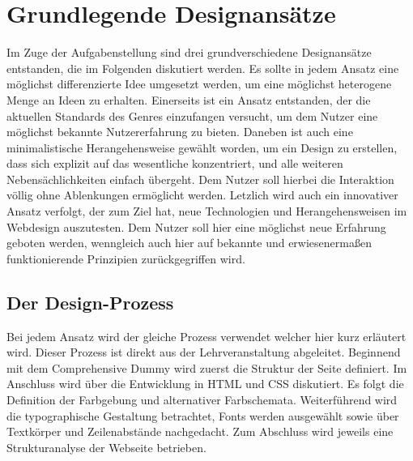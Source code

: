 \section{Grundlegende Designansätze}
Im Zuge der Aufgabenstellung sind drei grundverschiedene Designansätze entstanden, die im Folgenden diskutiert werden. Es sollte in jedem Ansatz eine möglichst differenzierte Idee umgesetzt werden, um eine möglichst heterogene Menge an Ideen zu erhalten.
Einerseits ist ein Ansatz entstanden, der die aktuellen Standards des Genres einzufangen versucht, um dem Nutzer eine möglichst bekannte Nutzererfahrung zu bieten.
Daneben ist auch eine minimalistische Herangehensweise gewählt worden, um ein Design zu erstellen, dass sich explizit auf das wesentliche konzentriert, und alle weiteren Nebensächlichkeiten einfach übergeht. Dem Nutzer soll hierbei die Interaktion völlig ohne Ablenkungen ermöglicht werden.
Letzlich wird auch ein innovativer Ansatz verfolgt, der zum Ziel hat, neue Technologien und Herangehensweisen im Webdesign auszutesten. Dem Nutzer soll hier eine möglichst neue Erfahrung geboten werden, wenngleich auch hier auf bekannte und erwiesenermaßen funktionierende Prinzipien zurückgegriffen wird.
\subsection{Der Design-Prozess}
Bei jedem Ansatz wird der gleiche Prozess verwendet welcher hier kurz erläutert wird. Dieser Prozess ist direkt aus der Lehrveranstaltung abgeleitet.
Beginnend mit dem Comprehensive Dummy wird zuerst die Struktur der Seite definiert. Im Anschluss wird über die Entwicklung in HTML und CSS diskutiert. Es folgt die Definition der Farbgebung und alternativer Farbschemata. Weiterführend wird die typographische Gestaltung betrachtet, Fonts werden ausgewählt sowie über Textkörper und Zeilenabstände nachgedacht. Zum Abschluss wird jeweils eine Strukturanalyse der Webseite betrieben.